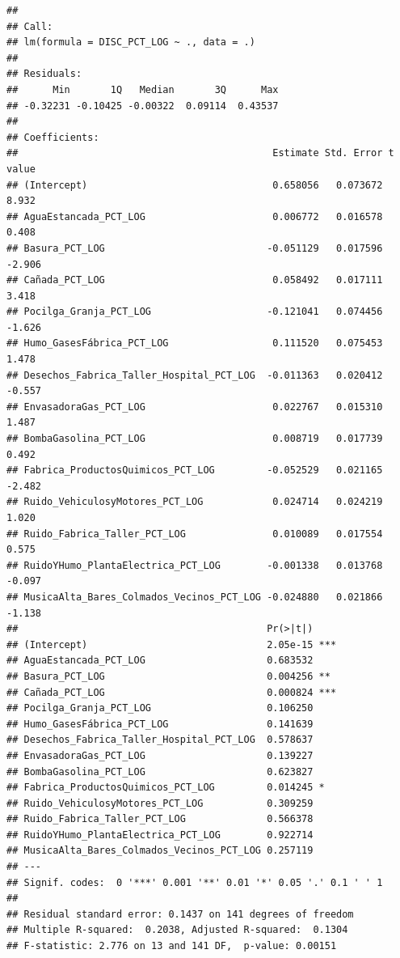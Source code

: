 \documentclass[11pt,]{article}
\newenvironment{Shaded}{\begin{snugshade}}{\end{snugshade}}
\newcommand{\StringTok}[1]{\textcolor[rgb]{0.31,0.60,0.02}{#1}}
\newcommand{\OperatorTok}[1]{\textcolor[rgb]{0.81,0.36,0.00}{\textbf{#1}}}
\newcommand{\NormalTok}[1]{#1}
\begin{document}
\begin{verbatim}
## 
## Call:
## lm(formula = DISC_PCT_LOG ~ ., data = .)
## 
## Residuals:
##      Min       1Q   Median       3Q      Max 
## -0.32231 -0.10425 -0.00322  0.09114  0.43537 
## 
## Coefficients:
##                                            Estimate Std. Error t value
## (Intercept)                                0.658056   0.073672   8.932
## AguaEstancada_PCT_LOG                      0.006772   0.016578   0.408
## Basura_PCT_LOG                            -0.051129   0.017596  -2.906
## Cañada_PCT_LOG                             0.058492   0.017111   3.418
## Pocilga_Granja_PCT_LOG                    -0.121041   0.074456  -1.626
## Humo_GasesFábrica_PCT_LOG                  0.111520   0.075453   1.478
## Desechos_Fabrica_Taller_Hospital_PCT_LOG  -0.011363   0.020412  -0.557
## EnvasadoraGas_PCT_LOG                      0.022767   0.015310   1.487
## BombaGasolina_PCT_LOG                      0.008719   0.017739   0.492
## Fabrica_ProductosQuimicos_PCT_LOG         -0.052529   0.021165  -2.482
## Ruido_VehiculosyMotores_PCT_LOG            0.024714   0.024219   1.020
## Ruido_Fabrica_Taller_PCT_LOG               0.010089   0.017554   0.575
## RuidoYHumo_PlantaElectrica_PCT_LOG        -0.001338   0.013768  -0.097
## MusicaAlta_Bares_Colmados_Vecinos_PCT_LOG -0.024880   0.021866  -1.138
##                                           Pr(>|t|)    
## (Intercept)                               2.05e-15 ***
## AguaEstancada_PCT_LOG                     0.683532    
## Basura_PCT_LOG                            0.004256 ** 
## Cañada_PCT_LOG                            0.000824 ***
## Pocilga_Granja_PCT_LOG                    0.106250    
## Humo_GasesFábrica_PCT_LOG                 0.141639    
## Desechos_Fabrica_Taller_Hospital_PCT_LOG  0.578637    
## EnvasadoraGas_PCT_LOG                     0.139227    
## BombaGasolina_PCT_LOG                     0.623827    
## Fabrica_ProductosQuimicos_PCT_LOG         0.014245 *  
## Ruido_VehiculosyMotores_PCT_LOG           0.309259    
## Ruido_Fabrica_Taller_PCT_LOG              0.566378    
## RuidoYHumo_PlantaElectrica_PCT_LOG        0.922714    
## MusicaAlta_Bares_Colmados_Vecinos_PCT_LOG 0.257119    
## ---
## Signif. codes:  0 '***' 0.001 '**' 0.01 '*' 0.05 '.' 0.1 ' ' 1
## 
## Residual standard error: 0.1437 on 141 degrees of freedom
## Multiple R-squared:  0.2038, Adjusted R-squared:  0.1304 
## F-statistic: 2.776 on 13 and 141 DF,  p-value: 0.00151
\end{verbatim}

\begin{Shaded}
\end{Shaded}
\end{document}
